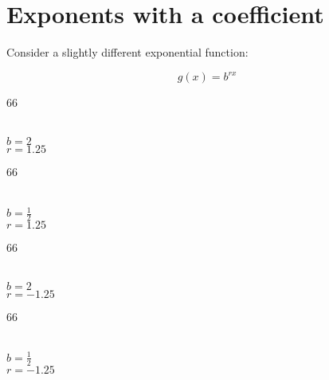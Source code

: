 \section{Exponents with a coefficient}
Consider a slightly different exponential function:
\begin{tcolorbox}[width=2in,center,colback=white,]
    \large
    \vspace{-1\onelineskip}
    \[ g(x) = b^{rx} \]
\end{tcolorbox}


\begin{tcbraster}[
    raster columns = 4,
    raster equal height,
    colback = white,
    raster equal skip = 0mm,
]
\begin{tcolorbox}[colframe=white]
    \begin{myTikzpictureGrid}{0.225} {6}{6}
    \end{myTikzpictureGrid}
    \\ 
    $b = 2 $ \\ 
    $r = 1.25 $
\end{tcolorbox}
\begin{tcolorbox}[colframe=white]
    \begin{myTikzpictureGrid}{0.225} {6}{6}
    \end{myTikzpictureGrid}
    \\ 
    $b = \frac{1}{2} $ \\ 
    $r = 1.25 $
\end{tcolorbox}
\begin{tcolorbox}[colframe=white]
    \begin{myTikzpictureGrid}{0.225} {6}{6}
    \end{myTikzpictureGrid}
    \\ 
    $b = 2 $ \\ 
    $r = -1.25 $
\end{tcolorbox}
\begin{tcolorbox}[colframe=white]
    \begin{myTikzpictureGrid}{0.225} {6}{6}
    \end{myTikzpictureGrid}
    \\ 
    $b = \frac{1}{2} $ \\ 
    $r = -1.25 $
\end{tcolorbox}
\end{tcbraster}

